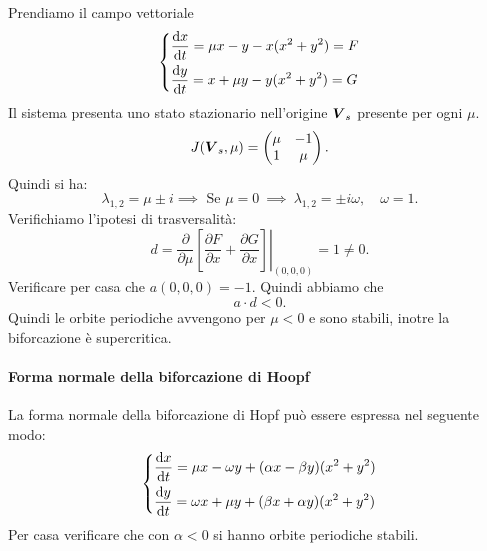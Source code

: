 \noindent
\begin{exmp}[]
    Prendiamo il campo vettoriale
	\[
	\begin{dcases}
	\frac{\text{d} x}{\text{d} t} = \mu x - y - x(x^2+y^2) = F\\
	\frac{\text{d} y}{\text{d} t} = x + \mu y - y(x^2 + y^2) =G
	\end{dcases}
	\]
    Il sistema presenta uno stato stazionario nell'origine $\boldsymbol{V}_s$ presente per ogni $\mu$.
    \[
	J(\boldsymbol{V}_s, \mu) = 
\begin{pmatrix}
    \mu & -1 \\
    1 & \mu \\
\end{pmatrix}
    .\] 
    Quindi si ha:
    \[
        \lambda_{1, 2}= \mu  \pm i \implies  \text{ Se }\mu =0 \ \implies\  \lambda_{1, 2} = \pm i\omega, \quad\omega =1
    .\] 
    Verifichiamo l'ipotesi di trasversalità:
    \[
	d = \frac{\partial }{\partial \mu} \left.\left[\frac{\partial F}{\partial x} + \frac{\partial G}{\partial x} \right]\right|_{(0, 0, 0)}=1\neq 0
    .\] 
    Verificare per casa che $a(0, 0, 0) = -1$. Quindi abbiamo che
    \[
        a\cdot d<0
    .\] 
    Quindi le orbite periodiche avvengono per $\mu <0$ e sono stabili, inotre la biforcazione è supercritica.
\end{exmp}
\noindent
\paragraph{Forma normale della biforcazione di Hoopf}%
La forma normale della biforcazione di Hopf può essere espressa nel seguente modo:
\[
\begin{dcases}
    \frac{\text{d} x}{\text{d} t} = \mu x-\omega y + (\alpha x -\beta y) (x^2 + y^2) \\
    \frac{\text{d} y}{\text{d} t} = \omega x + \mu  y + (\beta x + \alpha  y) (x^2 + y^2) 
\end{dcases}
\]
Per casa verificare che con $\alpha < 0	$ si hanno orbite periodiche stabili.
